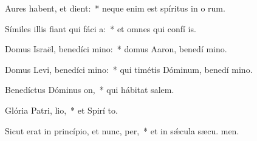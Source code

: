 \item Aures habent, et  dient:~* neque enim est spíritus in o rum.
\item Símiles illis fiant qui fáci a:~* et omnes qui confí  is.
\item Domus Israël, benedíci mino:~* domus Aaron, benedí mino.
\item Domus Levi, benedíci mino:~* qui timétis Dóminum, benedí mino.
\item Benedíctus Dóminus  on,~* qui hábitat  salem.
\item Glória Patri,  lio,~* et Spirí to.
\item Sicut erat in princípio, et nunc,  per,~* et in sǽcula sæcu. men.
